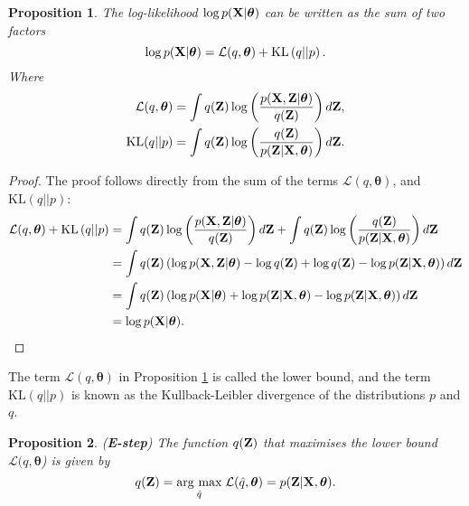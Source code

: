 \documentclass[11pt]{article}
\numberwithin{equation}{section}
\newcommand{\argmax}[1]{\underset{#1}{\operatorname{arg}\,\operatorname{max}}\;}
\newcommand{\KL}[2]{\text{KL}\left(#1 \vert\vert #2\right)}
\newcommand{\Z}{{\bf Z}}
\newtheorem{proposition}{Proposition}[section]
\begin{document}
\begin{proposition} \label{prop:log-likelihood-partition}
	The log-likelihood $\log p({\bf X} \vert \boldsymbol{\theta})$ can be written as the sum of two factors
	\begin{equation}
		\log p({\bf X} \vert \boldsymbol{\theta}) = \mathcal{L}(q, \boldsymbol{\theta}) +\KL{q}{p}.
	\end{equation}
	Where
	\begin{align}
		\mathcal{L}(q, \boldsymbol{\theta}) &= \int q({\bf Z})\log\left(\frac{p({\bf X}, {\bf Z} \vert \boldsymbol\theta)}{q({\bf Z})}\right) d{\bf Z},\\
		\text{KL}(q \vert\vert p) &= \int q({\bf Z}) \log\left(\frac{q({\bf Z})}{p({\bf Z}\vert {\bf X}, \boldsymbol\theta)}\right) d{\bf Z}.
	\end{align}
\end{proposition}

\begin{proof}
	The proof follows directly from the sum of the terms $\mathcal{L}(q, \boldsymbol{\theta})$, and  $\text{KL}(q \vert\vert p)$:
	\begin{align}
		\mathcal{L}(q, \boldsymbol{\theta}) + \KL{q}{p} &= \int q({\bf Z})\log\left(\frac{p({\bf X}, {\bf Z} \vert \boldsymbol\theta)}{q({\bf Z})}\right) d{\bf Z} + \int q({\bf Z}) \log\left(\frac{q({\bf Z})}{p({\bf Z}\vert {\bf X}, \boldsymbol\theta)}\right) d{\bf Z}\\
		&= \int q({\bf Z})\left(\log p({\bf X, {\bf Z} \vert \boldsymbol{\theta}}) - \log q({\bf Z}) + \log q({\bf Z}) - \log p({\bf Z} \vert {\bf X}, \boldsymbol\theta)\right) d{\bf Z}\\
		&= \int q({\bf Z})\left(\log p({\bf X} \vert \boldsymbol{\theta}) + \log p({\bf Z} \vert {\bf X}, \boldsymbol{\theta}) - \log p({\bf Z} \vert {\bf X}, \boldsymbol\theta)\right) d{\bf Z}\\
		&= \log p({\bf X}\vert \boldsymbol\theta).
	\end{align}
\end{proof}
The term $\mathcal{L}(q, \boldsymbol\theta)$ in Proposition \ref{prop:log-likelihood-partition} is called the lower bound, and the term $\KL{q}{p}$ is known as the Kullback-Leibler divergence of the distributions $p$ and $q$. 

\begin{proposition} (\textbf{E-step})
	The function $q({\bf Z})$ that maximises the lower bound $\mathcal L(q, \boldsymbol{\theta}$) is given by
	\begin{equation}
		q(\Z) = \argmax{\hat q} \mathcal{L}(\hat q, \boldsymbol\theta) = p({\bf Z} \vert {\bf X}, \boldsymbol\theta).
	\end{equation}
\end{proposition}
\end{document}
